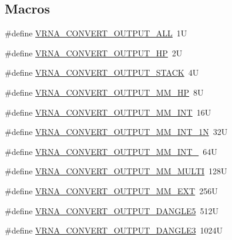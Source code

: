 \subsection*{Macros}
\begin{DoxyCompactItemize}
\item 
\#define \hyperlink{group__energy__parameters__convert_ga8dc6aee5a806c49b71557152f9616bc4}{V\+R\+N\+A\+\_\+\+C\+O\+N\+V\+E\+R\+T\+\_\+\+O\+U\+T\+P\+U\+T\+\_\+\+A\+LL}~1U
\item 
\#define \hyperlink{group__energy__parameters__convert_gaf66fe2cb11dfcfd32d791049c254a8a4}{V\+R\+N\+A\+\_\+\+C\+O\+N\+V\+E\+R\+T\+\_\+\+O\+U\+T\+P\+U\+T\+\_\+\+HP}~2U
\item 
\#define \hyperlink{group__energy__parameters__convert_gad23522d63f8d4c50d5a5deee9bee3ef2}{V\+R\+N\+A\+\_\+\+C\+O\+N\+V\+E\+R\+T\+\_\+\+O\+U\+T\+P\+U\+T\+\_\+\+S\+T\+A\+CK}~4U
\item 
\#define \hyperlink{group__energy__parameters__convert_gaa892c7b4957459090f3e08da298cc347}{V\+R\+N\+A\+\_\+\+C\+O\+N\+V\+E\+R\+T\+\_\+\+O\+U\+T\+P\+U\+T\+\_\+\+M\+M\+\_\+\+HP}~8U
\item 
\#define \hyperlink{group__energy__parameters__convert_ga4ff223fb1f9c62cd92d9ab811ad03d55}{V\+R\+N\+A\+\_\+\+C\+O\+N\+V\+E\+R\+T\+\_\+\+O\+U\+T\+P\+U\+T\+\_\+\+M\+M\+\_\+\+I\+NT}~16U
\item 
\#define \hyperlink{group__energy__parameters__convert_gaf5d3743219f83c6348155cd81e755bbb}{V\+R\+N\+A\+\_\+\+C\+O\+N\+V\+E\+R\+T\+\_\+\+O\+U\+T\+P\+U\+T\+\_\+\+M\+M\+\_\+\+I\+N\+T\+\_\+1N}~32U
\item 
\#define \hyperlink{group__energy__parameters__convert_ga78382ec622ba99e0ac2262317bdd7316}{V\+R\+N\+A\+\_\+\+C\+O\+N\+V\+E\+R\+T\+\_\+\+O\+U\+T\+P\+U\+T\+\_\+\+M\+M\+\_\+\+I\+N\+T\+\_}~64U
\item 
\#define \hyperlink{group__energy__parameters__convert_gae67af9f1cdf7baf2865481282a5d1034}{V\+R\+N\+A\+\_\+\+C\+O\+N\+V\+E\+R\+T\+\_\+\+O\+U\+T\+P\+U\+T\+\_\+\+M\+M\+\_\+\+M\+U\+L\+TI}~128U
\item 
\#define \hyperlink{group__energy__parameters__convert_gaf14ead7ef1fdbe725ade653750fc51e3}{V\+R\+N\+A\+\_\+\+C\+O\+N\+V\+E\+R\+T\+\_\+\+O\+U\+T\+P\+U\+T\+\_\+\+M\+M\+\_\+\+E\+XT}~256U
\item 
\#define \hyperlink{group__energy__parameters__convert_ga036ffd996d8c8a9acf631760dd1da24b}{V\+R\+N\+A\+\_\+\+C\+O\+N\+V\+E\+R\+T\+\_\+\+O\+U\+T\+P\+U\+T\+\_\+\+D\+A\+N\+G\+L\+E5}~512U
\item 
\#define \hyperlink{group__energy__parameters__convert_ga34a8a5479ef885834ef32f3fb43d79bc}{V\+R\+N\+A\+\_\+\+C\+O\+N\+V\+E\+R\+T\+\_\+\+O\+U\+T\+P\+U\+T\+\_\+\+D\+A\+N\+G\+L\+E3}~1024U

\end{DoxyCompactItemize}
